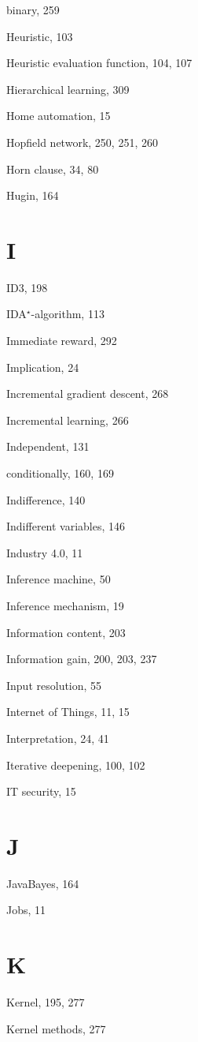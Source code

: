 \documentclass[10pt]{book}
\begin{document}
\begin{center}
binary, 259

Heuristic, 103

Heuristic evaluation function, 104, 107

Hierarchical learning, 309

Home automation, 15

Hopfield network, 250, 251, 260

Horn clause, 34, 80

Hugin, 164

\section{I}

ID3, 198

IDA$^{\star}$-algorithm, 113

Immediate reward, 292

Implication, 24

Incremental gradient descent, 268

Incremental learning, 266

Independent, 131

conditionally, 160, 169

Indifference, 140

Indifferent variables, 146

Industry 4.0, 11

Inference machine, 50

Inference mechanism, 19

Information content, 203

Information gain, 200, 203, 237

Input resolution, 55

Internet of Things, 11, 15

Interpretation, 24, 41

Iterative deepening, 100, 102

IT security, 15

\section{J}

JavaBayes, 164

Jobs, 11

\section{K}

Kernel, 195, 277

Kernel methods, 277


\end{center}
\end{document}
